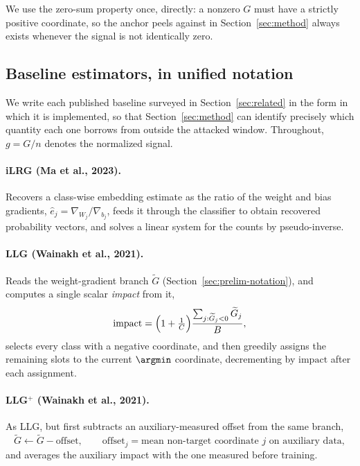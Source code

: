 We use the zero-sum property once, directly: a nonzero $G$ must have a
strictly positive coordinate, so the anchor \ourmethod{} peels against in
Section~\ref{sec:method} always exists whenever the signal is not
identically zero.

\subsection{Baseline estimators, in unified notation}
\label{sec:prelim-baselines}

We write each published baseline surveyed in Section~\ref{sec:related} in
the form in which it is implemented, so that Section~\ref{sec:method} can
identify precisely which quantity each one borrows from outside the
attacked window. Throughout, $g = G/n$ denotes the normalized signal.

\paragraph{iLRG (Ma et al., 2023).}
Recovers a class-wise embedding estimate as the ratio of the weight and
bias gradients, $\hat e_j = \nabla_{W_j}/\nabla_{b_j}$, feeds it through
the classifier to obtain recovered probability vectors, and solves a
linear system for the counts by pseudo-inverse.

\paragraph{LLG (Wainakh et al., 2021).}
Reads the weight-gradient branch $\widetilde G$ (Section~\ref{sec:prelim-notation}),
and computes a single scalar \emph{impact} from it,
\[
 \mathrm{impact} = \Bigl(1 + \tfrac1C\Bigr)\frac{\sum_{j : \widetilde G_j<0} \widetilde G_j}{B},
\]
selects every class with a negative coordinate, and then greedily assigns
the remaining slots to the current $\argmin$ coordinate, decrementing by
$\mathrm{impact}$ after each assignment.

\paragraph{LLG$^+$ (Wainakh et al., 2021).}
As LLG, but first subtracts an auxiliary-measured offset from the same
branch,
\[
 \widetilde G \longleftarrow \widetilde G - \mathrm{offset}, \qquad
 \mathrm{offset}_j = \text{mean non-target coordinate $j$ on auxiliary data},
\]
and averages the auxiliary impact with the one measured before training.

